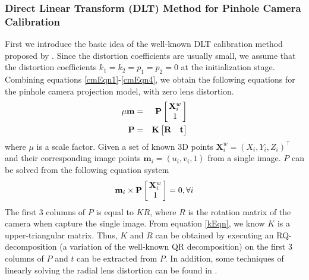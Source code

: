 \documentclass{report}
\begin{document}
\subsubsection{Direct Linear Transform (DLT) Method for Pinhole Camera Calibration}
First we introduce the basic idea of the well-known DLT calibration method proposed by \cite{}. Since the distortion coefficients are usually small, we assume that the distortion coefficients $k_1 = k_2 = p_1 = p_2 = 0$ at the initialization stage. Combining equations \ref{cmEqn1}-\ref{cmEqn4}, we obtain the following equations for the pinhole camera projection model, with zero lens distortion. 
\begin{eqnarray}
\mu \mathbf{m} &=& \mathbf{P} 
\arraycolsep=1.5pt%
\begin{bmatrix}
	\begin{array}{c}
	\mathbf{X}^w_i \\ 1
	\end{array}
\end{bmatrix} \\
\mathbf{P} &=& \mathbf{K} 
\begin{bmatrix}
\mathbf{R} & \mathbf{t}
\end{bmatrix} 
\end{eqnarray}
where $\mu$ is a scale factor. Given a set of known 3D points $\mathbf{X}^w_i = (X_i, Y_i, Z_i)^\top$ and their corresponding image points $\mathbf{m}_i = (u_i, v_i, 1)$ from a single image. $P$ can be solved from the following equation system 
\begin{equation}
\mathbf{m}_i \times \mathbf{P} 
\arraycolsep=1.5pt%
\begin{bmatrix}
	\begin{array}{c}
	\mathbf{X}^w_i \\ 1
	\end{array}
\end{bmatrix}
 = 0, \forall i
\end{equation}
The first 3 columns of $P$ is equal to $K R$, where $R$ is the rotation matrix of the camera when capture the single image. From equation \ref{kEqn}, we know $K$ is a upper-triangular matrix. Thus, $K$ and $R$ can be obtained by executing an RQ-decomposition (a variation of the well-known QR decomposition) on the first 3 columns of $P$ and $t$ can be extracted from $P$. In addition, some techniques of linearly solving the radial lens distortion can be found in \cite{}. 
\end{document}
